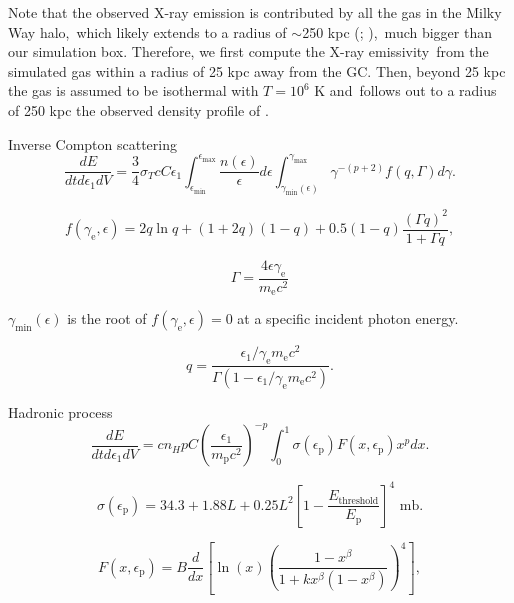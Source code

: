 \documentclass[twocolumn]{aastex631}
\begin{document}
Note that the observed X-ray emission is contributed by all the gas in the Milky Way halo,\
which likely extends to a radius of $\sim$250 kpc (\citealt{halo-radius-1}; \citealt{halo-radius-2}),\
much bigger than our simulation box. Therefore, we first compute the X-ray emissivity\
from the simulated gas within a radius of 25 kpc away from the GC.
Then, beyond 25 kpc the gas is assumed to be isothermal with $T=10^6$ K and\
follows out to a radius of 250 kpc the observed density profile of \citep{temperature-MW}.

Inverse Compton scattering
\begin{equation}
  \frac{dE}{dtd\epsilon_{1}dV} = \frac{3}{4}\sigma_{T}c\textit{C}\epsilon_{1}\int^{\epsilon_{\text{max}}}_{\epsilon_{\text{min}}}
               \frac{n(\epsilon)}{\epsilon}d\epsilon\int^{\gamma_{\text{max}}}_{\gamma_{\text{min}}\left(\epsilon\right)}
               \gamma^{-(p+2)}f(q, \Gamma)d\gamma.
\end{equation}


\begin{equation}
f(\gamma_{\text{e}}, \epsilon) = 2q\ln q+(1+2q)(1-q)+0.5(1-q)\frac{\left(\Gamma q\right)^2}{1+\Gamma q},
\end{equation}

\begin{equation}
\Gamma=\frac{4\epsilon \gamma_{\text{e}}}{m_{\text{e}}c^2}
\end{equation}

$\gamma_{\text{min}}\left(\epsilon\right)$ is the root of $f(\gamma_{\text{e}}, \epsilon)=0$ at a specific incident photon energy.

\begin{equation}
q=\frac{\epsilon_{1}/\gamma_{\text{e}}m_{\text{e}}c^{2}}{\Gamma\left(1-\epsilon_{1}/\gamma_{\text{e}}m_{\text{e}}c^{2}\right)}.
\end{equation}


Hadronic process
\begin{equation}
  \frac{dE}{dtd\epsilon_{1}dV} = cn_{H}pC\left(\frac{\epsilon_{1}}{m_{\text{p}}c^2}\right)^{-p}\int_{0}^{1}\sigma(\epsilon_{\text{p}}) F(x,\epsilon_{\text{p}}) x^{p}dx.
\end{equation}

\begin{equation}
\sigma(\epsilon_{\text{p}})=34.3+1.88L+0.25L^{2}\left[1-\frac{E_{\text{threshold}}}{E_{\text{p}}}\right]^{4} \text{ mb}.
\end{equation}

\begin{equation}
F(x,\epsilon_{\text{p}})=B\frac{d}{dx}\left[\ln(x)\left(\frac{1-x^{\beta}}{1+kx^{\beta}\left(1-x^{\beta}\right)}\right)^4\right],
\end{equation}
\end{document}
